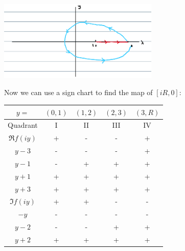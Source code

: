\documentclass{article}
\begin{document}
\begin{itemize}
            \begin{center}
                  \includegraphics[width=3in]{p2-2.png}
            \end{center}
            Now we can use a sign chart to find the map of $[iR,0]$:
            \begin{center}
                  \begin{tabular}{c|c|c|c|c}
                        \hline
                        $y=$        & $(0,1)$ & $(1,2)$ & $(2,3)$ & $(3,R)$ \\
                        \hline\hline
                        Quadrant    & I       & II      & III     & IV      \\
                        \hline\hline
                        $\Re f(iy)$ & +       & -       & -       & +       \\
                        \hline
                        $y-3$       & -       & -       & -       & +       \\
                        \hline
                        $y-1$       & -       & +       & +       & +       \\
                        \hline
                        $y+1$       & +       & +       & +       & +       \\
                        \hline
                        $y+3$       & +       & +       & +       & +       \\
                        \hline\hline
                        $\Im f(iy)$ & +       & +       & -       & -       \\
                        \hline
                        $-y$        & -       & -       & -       & -       \\
                        \hline
                        $y-2$       & -       & -       & +       & +       \\
                        \hline
                        $y+2$       & +       & +       & +       & +       \\
                        \hline\hline
                  \end{tabular}
            \end{center}

\end{itemize}
\end{document}
